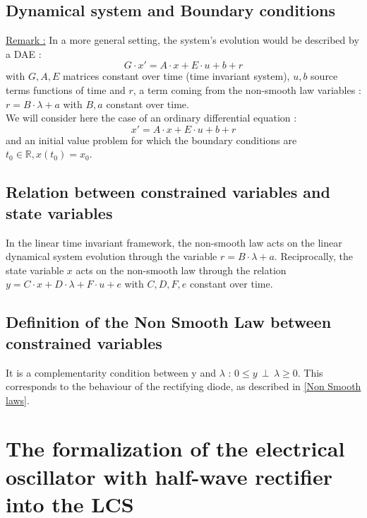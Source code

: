 \documentclass[10pt]{article}
\begin{document}
\subsection{Dynamical system and Boundary conditions}
\underline{Remark :}
In a more general setting, the system's evolution would be described by a DAE :
\[
G \cdot x' = A \cdot x + E \cdot u + b + r 
\]
with $G , A , E$ matrices constant over time (time invariant system), $u , b$ source terms functions of time and $r$,
a term coming from the non-smooth law variables : $r = B \cdot \lambda + a$ with $B , a$ constant over time.\\
We will consider here the case of an ordinary differential equation :
\[
x' = A \cdot x + E \cdot u + b + r 
\]
and an initial value problem for which the boundary conditions are $t_0 \in \mathbb{R} , x(t_0)= x_0$.

\subsection{Relation between constrained variables and state variables}
In the linear time invariant framework, the non-smooth law acts on the linear dynamical system evolution through the variable 
$r = B \cdot \lambda + a$. Reciprocally, the state variable $x$ acts on the non-smooth law through the relation
$y = C \cdot x + D \cdot \lambda + F \cdot u + e$ with $C , D , F , e$ constant over time.

\subsection{Definition of the Non Smooth Law between constrained variables}
It is a complementarity condition between y and $\lambda$ : $0 \leq y \, \perp \, \lambda \geq 0$. This corresponds
to the behaviour of the rectifying diode, as described in \ref{Non Smooth laws}.
 
\section{The formalization of the electrical oscillator with half-wave rectifier into the LCS}
\end{document}
